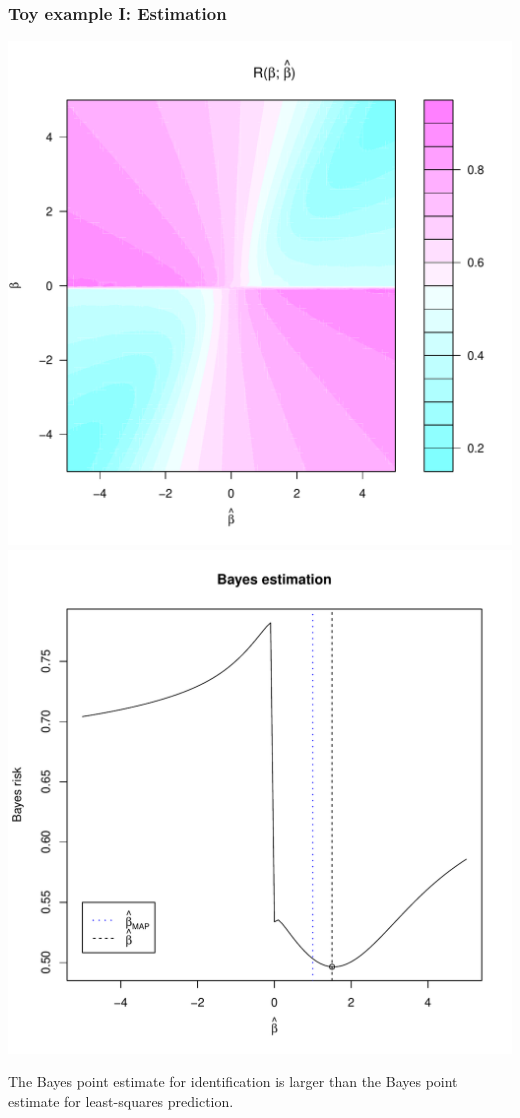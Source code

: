 \documentclass{beamer}
\begin{document}
\begin{frame}
\frametitle{Toy example I: Estimation}
\begin{center}
\includegraphics[scale = .3]{rmat.pdf}
\includegraphics[scale = .3]{toy_est.pdf}
\end{center}
The Bayes point estimate for identification is larger than the Bayes point estimate for least-squares prediction.
\end{frame}
\end{document}
